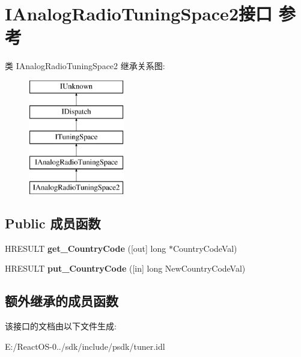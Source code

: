 \hypertarget{interface_i_analog_radio_tuning_space2}{}\section{I\+Analog\+Radio\+Tuning\+Space2接口 参考}
\label{interface_i_analog_radio_tuning_space2}
类 I\+Analog\+Radio\+Tuning\+Space2 继承关系图\+:\begin{figure}[H]
\begin{center}
\leavevmode
\includegraphics[height=5.000000cm]{interface_i_analog_radio_tuning_space2}
\end{center}
\end{figure}
\subsection*{Public 成员函数}
\begin{DoxyCompactItemize}
\item 
\mbox{\label{interface_i_analog_radio_tuning_space2_a2bb2055e837c5fea309d39b0a016bf5c}} 
H\+R\+E\+S\+U\+LT {\bfseries get\+\_\+\+Country\+Code} (\mbox{[}out\mbox{]} long $\ast$Country\+Code\+Val)
\item 
\mbox{\label{interface_i_analog_radio_tuning_space2_ace974579a6924331e896c5c58382c731}} 
H\+R\+E\+S\+U\+LT {\bfseries put\+\_\+\+Country\+Code} (\mbox{[}in\mbox{]} long New\+Country\+Code\+Val)
\end{DoxyCompactItemize}
\subsection*{额外继承的成员函数}


该接口的文档由以下文件生成\+:\begin{DoxyCompactItemize}
\item 
E\+:/\+React\+O\+S-\/0../sdk/include/psdk/tuner.\+idl\end{DoxyCompactItemize}
